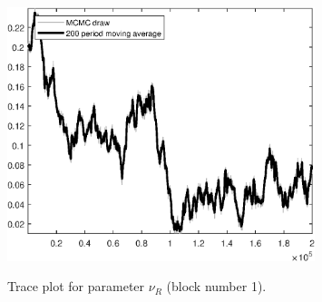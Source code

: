 \begin{figure}[H]
\centering
  \includegraphics[width=0.8\textwidth]{BRS_sectoral_rest/graphs/TracePlot_nu_R_blck_1}\\
    \caption{Trace plot for parameter ${\nu_R}$ (block number 1).}
\end{figure}
